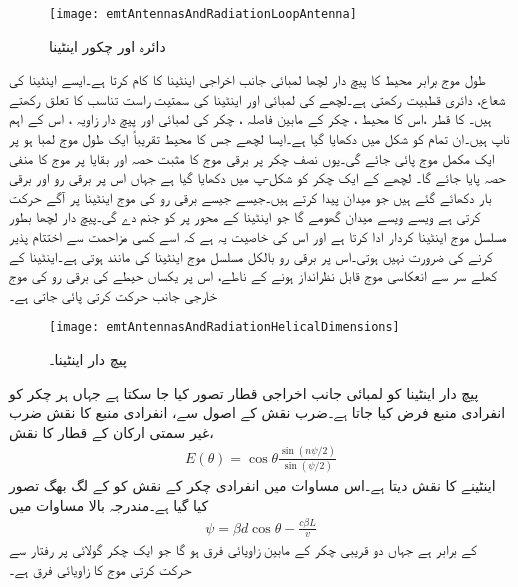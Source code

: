 \begin{figure}
\centering
\texttt{[image: emtAntennasAndRadiationLoopAntenna]}
\caption{دائرہ اور چکور اینٹینا}
\label{شکل_اینٹینا_دائرہ_چکور}
\end{figure}

طول موج برابر محیط کا پیچ دار لچھا لمبائی جانب اخراجی اینٹینا کا کام کرتا ہے۔ایسے اینٹینا کی شعاع،  دائری قطبیت رکھتی ہے۔لچھے کی لمبائی اور  اینٹینا کی سمتیت راست تناسب کا تعلق رکھتے ہیں۔ کا قطر ،اس کا محیط ، چکر کے مابین فاصلہ ، چکر کی لمبائی  اور پیچ دار زاویہ ، اس کے اہم ناپ ہیں۔ان تمام کو شکل  میں دکھایا گیا ہے۔ایسا لچھے جس  کا محیط  تقریباً  ایک طول موج  لمبا ہو پر ایک مکمل موج پائی جائے گی۔یوں نصف چکر پر برقی موج کا مثبت حصہ اور بقایا پر موج کا منفی حصہ پایا جائے گا۔ لچھے کے ایک چکر کو شکل-پ میں دکھایا گیا ہے جہاں اس پر برقی رو اور برقی بار دکھائے گئے ہیں جو میدان  پیدا کرتے ہیں۔جیسے جیسے برقی رو کی موج اینٹینا پر آگے حرکت کرتی ہے ویسے ویسے میدان  گھومے گا جو اینٹینا کے محور پر  کو جنم دے گی۔پیچ دار لچھا بطور مسلسل موج اینٹینا کردار ادا کرتا ہے اور اس کی خاصیت یہ ہے کہ اسے کسی مزاحمت سے اختتام پذیر کرنے کی ضرورت نہیں ہوتی۔اس پر برقی رو بالکل مسلسل موج اینٹینا کی مانند ہوتی ہے۔اینٹینا کے کھلے سر سے انعکاسی موج قابل نظرانداز ہونے کے ناطے، اس پر یکساں حیطے کی برقی رو کی موج خارجی جانب حرکت کرتی پائی جاتی ہے۔

\begin{figure}
\centering
\texttt{[image: emtAntennasAndRadiationHelicalDimensions]}
\caption{پیچ دار اینٹینا۔}
\label{شکل_اینٹینا_پیچ_دار_الف}
\end{figure}

پیچ دار اینٹینا کو لمبائی جانب اخراجی قطار تصور کیا جا سکتا ہے جہاں ہر چکر کو انفرادی منبع فرض کیا جاتا ہے۔ضرب نقش کے اصول سے، انفرادی منبع کا نقش ضرب غیر سمتی ارکان کے  قطار کا نقش، 
\begin{align}\label{مساوات_اینٹینا_لمبی_پیچ_دار_اینٹینا}
E(\theta)=\cos \theta \frac{\sin (n\psi\!/\!2)}{\sin(\psi\!/\!2)}
\end{align}
اینٹینے  کا نقش دیتا ہے۔اس مساوات میں انفرادی چکر کے نقش کو  کے لگ بھگ تصور کیا گیا ہے۔مندرجہ بالا مساوات میں
\begin{align}\label{مساوات_اینٹینا_لمبی_پیچ_دار_اینٹینا_زاویائی_فرق}
\psi=\beta d \cos \theta- \frac{c \beta L}{v}
\end{align}
کے برابر ہے جہاں دو قریبی چکر کے مابین زاویائی فرق  ہو گا جو  ایک چکر گولائی  پر  رفتار سے حرکت کرتی موج کا زاویائی فرق ہے۔


